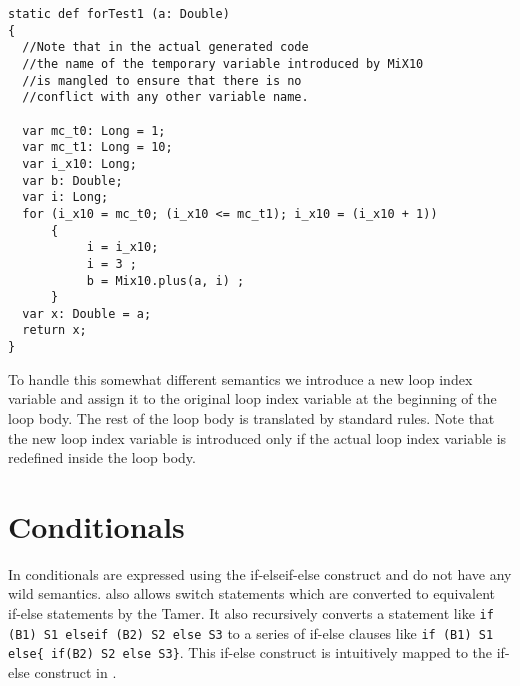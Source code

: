 \begin{lstlisting}[language=X10,numbers=none]
static def forTest1 (a: Double)
{
  //Note that in the actual generated code
  //the name of the temporary variable introduced by MiX10
  //is mangled to ensure that there is no 
  //conflict with any other variable name. 
  
  var mc_t0: Long = 1;
  var mc_t1: Long = 10;
  var i_x10: Long;
  var b: Double;
  var i: Long;
  for (i_x10 = mc_t0; (i_x10 <= mc_t1); i_x10 = (i_x10 + 1))
      {   
           i = i_x10;
           i = 3 ;
           b = Mix10.plus(a, i) ;
      }
  var x: Double = a;
  return x;
}
\end{lstlisting}

To handle this somewhat different semantics we introduce a new loop
index variable and assign it to the original loop index variable at the
beginning of the loop body. The rest of the loop body is translated by
standard rules.  Note that the new loop index variable is
introduced only if the actual loop index variable is redefined inside
the loop body. 

\section{Conditionals}

In \matlab conditionals are expressed using the if-elseif-else construct
and do not have any wild semantics. \matlab also allows switch
statements which are converted to equivalent if-else statements by the
Tamer. It also recursively converts a statement like 
\texttt{if (B1) S1 elseif (B2) S2 else S3} to a series of if-else clauses like 
\texttt{if (B1) S1 else\{ if(B2) S2 else S3\}}. This if-else construct is 
intuitively mapped to the if-else construct in \xten. 


